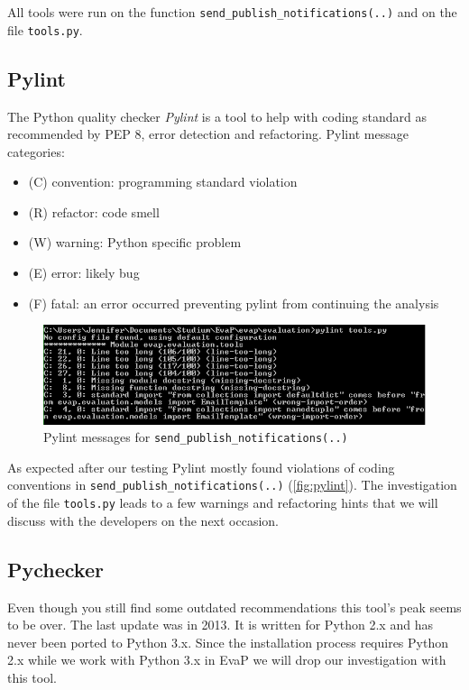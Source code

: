 All tools were run on the function \texttt{send\_publish\_notifications(..)} and on the file \texttt{tools.py}.

\subsection{Pylint}
The Python quality checker \emph{Pylint} is a tool to help with coding standard as recommended by PEP 8, error detection and refactoring.
Pylint message categories:
\begin{itemize}
    \item (C) convention: programming standard violation
    \item (R) refactor: code smell
    \item (W) warning: Python specific problem
    \item (E) error: likely bug
    \item (F) fatal: an error occurred preventing pylint from continuing the analysis
\end{itemize}
\begin{figure}[h]
    \centering
    \includegraphics[width=\textwidth, keepaspectratio]{graphics/pylint_send_publish_notifications_1}
    \caption{Pylint messages for \texttt{send\_publish\_notifications(..)}}
    \label{fig:pylint}
\end{figure} 
As expected after our testing Pylint mostly found violations of coding conventions in \texttt{send\_publish\_notifications(..)} (\autoref{fig:pylint}).
The investigation of the file \texttt{tools.py} leads to a few warnings and refactoring hints that we will discuss with the developers on the next occasion.

\subsection{Pychecker}
Even though you still find some outdated recommendations this tool's peak seems to be over. 
The last update was in 2013.
It is written for Python 2.x and has never been ported to Python 3.x.
Since the installation process requires Python 2.x while we work with Python 3.x in EvaP we will drop our investigation with this tool.

